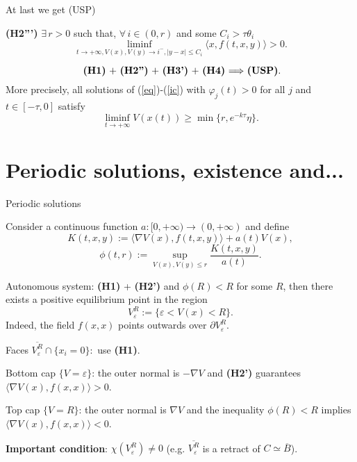 \documentclass{beamer}
\begin{document}
\begin{frame}{ At last we get (USP)}

{\bf (H2''')} $\exists \, r>0$ such that, $\forall \, i\in (0,r)$ and some $C_i>\tau \theta_i$ 
$$\liminf_{t\to+\infty, V(x),V(y)\to i^-, |y-x|\le C_i }\langle x,f(t,x,y)\rangle  > 0.
$$

\begin{theorem}

$$\hbox{ {\bf (H1)} $+$ 
{\bf (H2'')}
$+$ 
{\bf (H3')}
$+$ 
{\bf (H4)}
$\Longrightarrow$ {\bf (USP)}.}$$ 
More precisely, all solutions of (\ref{eq})-(\ref{ic}) with $\varphi_j(t)>0$ for all $j$ and $t\in [-\tau,0]$ satisfy 
$$\liminf_{t\to+\infty} V(x(t))\ge \min\{ r, e^{-k\tau}\eta \}.$$
\end{theorem}

\end{frame}

\section{Periodic solutions, existence and...}


\begin{frame}{Periodic solutions}
    
Consider a continuous function $a:[0,+\infty)\to (0,+\infty)$ and define
$$K(t,x,y):= 
\langle \nabla V(x),f(t,x,y)\rangle + a(t)V(x),
$$
$$\phi(t,r):= 
 \sup_{V(x),V(y)\le r} {\frac {K(t,x,y)}{a(t)}}.
$$

\medskip 

Autonomous system:  
{\bf (H1)} + 
{\bf (H2')}  and  
 $\phi(R)<R$ for some $R$, then there exists a positive equilibrium point in the region  
$$
V_\varepsilon^R:=\{ \varepsilon < V(x) < R\}.
$$
Indeed, the field $f(x,x)$ points outwards over $\partial V_\varepsilon^R$.


\end{frame}

\begin{frame}{
}

Faces $\overline{V_\varepsilon^R}\cap \{ 
x_i = 0\}:$ use {\bf (H1)}. 
\bigskip

Bottom cap $\{V=\varepsilon\}$: the outer normal is $-\nabla V$ and
{\bf (H2')} guarantees $\langle \nabla V(x),f(x,x)\rangle>0$.

\bigskip

Top cap $\{V=R\}$: the outer normal is $\nabla V$ and
the inequality  $\phi(R)<R$ implies 
$\langle \nabla V(x),f(x,x)\rangle <0$. 
 
\bigskip
\pause 

{\bf Important condition}: $\chi(V_\varepsilon^R)\ne 0$ (e.g. $\overline{V_\varepsilon^R}$
is a retract of $C\simeq \overline B$). 
    
\end{frame}
\end{document}
